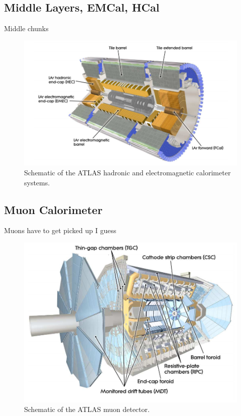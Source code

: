\subsection{Middle Layers, EMCal, HCal}
Middle chunks 
\begin{figure}[h!]
	\centering
	\includegraphics[width=\columnwidth]{../ThesisImages/LHCImages/ATLASCaloSystem.png}
	\caption[Schematic of the ATLAS hadronic and electromagnetic calorimeter systems.]{Schematic of the ATLAS hadronic and electromagnetic calorimeter systems.\cite{ATLAS}
	}
	\label{fig:ATLASCaloSys}
\end{figure}




\subsection{Muon Calorimeter}
Muons have to get picked up I guess
\begin{figure}[h!]
	\centering
	\includegraphics[width=\columnwidth]{../ThesisImages/LHCImages/ATLASMuonSystem.png}
	\caption[Schematic of the ATLAS muon detector.]{Schematic of the ATLAS muon detector.\cite{ATLAS}
	}
	\label{fig:ATLASMuonSys}
\end{figure}

